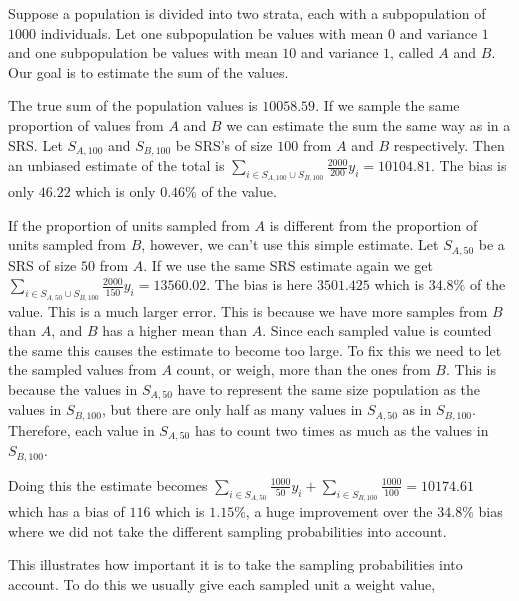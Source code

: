 \documentclass{article}
\begin{document}
\begin{example} \label{ex:uneqProbs}
  Suppose a population is divided into two strata, each with a subpopulation of
  \(1000\) individuals. Let one subpopulation be values with mean
  \(0\) and variance \(1\) and one subpopulation be values with mean \(10\) and variance \(1\), called
  \(A\) and \(B\).
  Our goal is to estimate the sum of the values.

  The true sum of the population values is \(10058.59\). If we sample the same
  proportion of values from \(A\) and \(B\) we can estimate the sum the same way
  as in a SRS. Let \(S_{A, 100}\) and
  \(S_{B, 100}\) be SRS's of size \(100\) from \(A\) and \(B\) respectively.
  Then an unbiased estimate of the total is \(\sum_{i \in S_{A, 100} \cup S_{B,
      100} } \frac{2000}{200} y_i = 10104.81\). The bias is only \(46.22\) which is only \(0.46\%\) of the
  value.

  If the proportion of units sampled from \(A\) is different from the
  proportion of units sampled from \(B\), however, we
  can't use this simple estimate. Let \(S_{A, 50}\) be a SRS of size \(50\)
  from \(A\). If we use the same SRS estimate again we get \(\sum_{i \in S_{A, 50} \cup S_{B,
      100}} \frac{2000}{150} y_i = 13560.02\). The bias is here \(3501.425\) which is \(34.8\%\) of the
  value. This is a much larger error. This is because we have more samples from
  \(B\) than \(A\), and \(B\) has a higher mean than \(A\). Since each sampled
  value is counted the same this causes the estimate to become too large. To fix
  this we need to let the sampled values from \(A\) count, or weigh, more than
  the ones from \(B\). This is because the values in \(S_{A, 50}\) have to
  represent the same size population as the values in \(S_{B, 100}\), but there
  are only half as many values in \(S_{A, 50}\) as in \(S_{B, 100}\). Therefore,
  each value in \(S_{A, 50}\) has to count two times as much as the values in \(S_{B, 100}\).

  Doing this the estimate becomes \(\sum_{i
    \in S_{A, 50}} \frac{1000}{50} y_i + \sum_{i \in S_{B, 100}}
  \frac{1000}{100} = 10174.61\) which has a bias of \(116\) which is \(1.15\%\),
  a huge improvement over the \(34.8\%\) bias where we did not take the
  different sampling probabilities into account.
\end{example}

This illustrates how important it is to take the sampling probabilities into
account. To do this we usually give each sampled unit a weight value,
\end{document}
